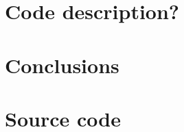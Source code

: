 \documentclass[a4paper, 12pt]{article}
\numberwithin{equation}{subsection}
\begin{document}
	\section{Code description?}
	
	\section{Conclusions}
	
	\clearpage
	\nocite{*}
	
	
	
	
	
	\appendix
	\clearpage
	\section{Source code} \label{apsec:code}
	\clearpage
	
	
\end{document}
